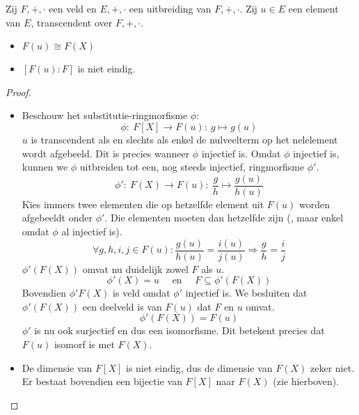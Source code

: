 \documentclass[main.tex]{subfiles}
\begin{document}
\begin{st}
  \label{st:uitbreiding-van-transcendente-u-aan-veld-graad-oneindig}
  Zij $F,+,\cdot$ een veld en $E,+,\cdot$ een uitbreiding van $F,+,\cdot$.
  Zij $u\in E$ een element van $E$, transcendent over $F,+,\cdot$.
  \begin{itemize}
  \item $F(u) \cong F(X)$
  \item $[F(u):F]$ is niet eindig.
  \end{itemize}

  \begin{proof}
    \begin{itemize}
    \item Beschouw het substitutie-ringmorfisme $\phi$:
      \[ \phi:\ F[X] \rightarrow F(u):\ g \mapsto g(u) \]
      $u$ is transcendent als en slechts als enkel de nulveelterm op het nelelement wordt afgebeeld.
      Dit is precies wanneer $\phi$ injectief is.
      Omdat $\phi$ injectief is, kunnen we $\phi$
      uitbreiden tot een, nog steeds injectief, ringmorfisme $\phi'$.
      \[ \phi':\ F(X) \rightarrow F(u):\ \frac{g}{h} \mapsto \frac{g(u)}{h(u)} \]
      Kies immers twee elementen die op hetzelfde element uit $F(u)$ worden afgebeeldt onder $\phi'$.
      Die elementen moeten dan hetzelfde zijn (, maar enkel omdat $\phi$ al injectief is).
      \[ \forall g,h,i,j \in F(u): \frac{g(u)}{h(u)} = \frac{i(u)}{j(u)} \Rightarrow \frac{g}{h} = \frac{i}{j} \]
      $\phi'(F(X))$ omvat nu duidelijk zowel $F$ als $u$.
      \[ \phi'(X) = u \quad\text{ en }\quad F \subseteq \phi'(F(X)) \]
      Bovendien $\phi'F(X)$ is veld omdat $\phi'$ injectief is.
      We besluiten dat $\phi'(F(X))$ een deelveld is van $F(u)$ dat $F$ en $u$ omvat.
      \[ \phi'(F(X)) = F(u) \]
      $\phi'$ is nu ook surjectief en dus een isomorfisme.
      Dit betekent precies dat $F(u)$ isomorf is met $F(X)$.
    \item De dimensie van $F[X]$ is niet eindig, dus de dimensie van $F(X)$ zeker niet.
      Er bestaat bovendien een bijectie van $F[X]$ naar $F(X)$ (zie hierboven).
    \end{itemize}
  \end{proof}
\end{st}
\end{document}
